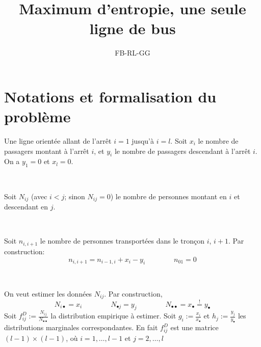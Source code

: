 \documentclass{svmult}
\begin{document}
 
\title*{Maximum d'entropie, une seule ligne de bus}

\author{FB-RL-GG}
%
%



\maketitle



 
\section*{Notations et formalisation du problème}
Une ligne orientée allant de l'arrêt  $i=1$ jusqu'à $i=l$. Soit $x_i$ le nombre de passagers montant à l'arrêt $i$, et $y_i$ le nombre de passagers descendant à l'arrêt $i$. On a 
$y_1=0$ et $x_l=0$. 

\

Soit $N_{ij}$ (avec $i<j$; sinon $N_{ij}=0$) le nombre de personnes montant en $i$ et descendant en $j$. 

\

Soit $n_{i,i+1}$ le nombre de personnes transportées dans le tronçon $i$, $i+1$. Par construction: 
\begin{equation}
\label{ }
n_{i,i+1}=n_{i-1,i}+x_i-y_i\qquad\qquad n_{01}=0
\end{equation}

\

On veut estimer les données $N_{ij}$. Par construction, 
\begin{equation}
\label{constraints_margins}
N_{i\bullet}=x_i\qquad\qquad N_{\bullet j}=y_j\qquad\qquad N_{\bullet\bullet}=x_\bullet \stackrel{!}{=}y_\bullet
\end{equation}
Soit $f_{ij}^D:=\frac{N_{ij}}{N_{\bullet\bullet}}$ la distribution empirique à estimer. Soit $g_i:=\frac{x_i}{x_\bullet}$ et  $h_j:=\frac{y_j}{y_\bullet}$ les distributions marginales correspondantes. En fait $f_{ij}^D$ est une matrice $(l-1)\times (l-1)$, où $i=1,\ldots, l-1$ et $j=2,\ldots, l$ 
\end{document}
